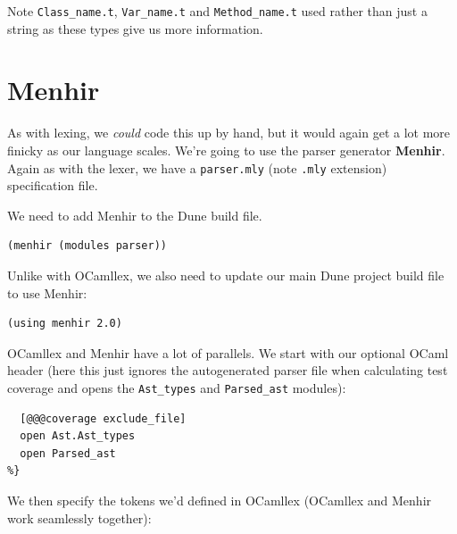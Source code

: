 Note \texttt{Class\_name.t}, \texttt{Var\_name.t} and
\texttt{Method\_name.t} used rather than just a string as these types
give us more information.

\hypertarget{menhir}{%
\section{\texorpdfstring{\protect\hyperlink{menhir}{}Menhir}{Menhir}}\label{menhir}}

As with lexing, we \emph{could} code this up by hand, but it would again
get a lot more finicky as our language scales. We're going to use the
parser generator \textbf{Menhir}. Again as with the lexer, we have a
\texttt{parser.mly} (note \texttt{.mly} extension) specification file.

We need to add Menhir to the Dune build file.



\begin{verbatim}
(menhir (modules parser))
\end{verbatim}

Unlike with OCamllex, we also need to update our main Dune project build
file to use Menhir:



\begin{lstlisting}[caption={dune-project}]
(using menhir 2.0)
\end{lstlisting}

OCamllex and Menhir have a lot of parallels. We start with our optional
OCaml header (here this just ignores the autogenerated parser file when
calculating test coverage and opens the \texttt{Ast\_types} and
\texttt{Parsed\_ast} modules):

%

\begin{lstlisting}[caption={parser.mly}]
%{
  [@@@coverage exclude_file]
  open Ast.Ast_types
  open Parsed_ast
%}
\end{lstlisting}

We then specify the tokens we'd defined in OCamllex (OCamllex and Menhir
work seamlessly together):



